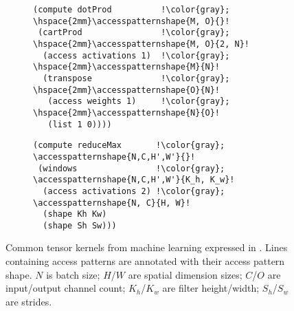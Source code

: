 \begin{figure*}
\begin{minipage}{.45\textwidth}
\begin{subfigure}{\textwidth}
\begin{lstlisting}[basicstyle=\footnotesize,escapechar=!]
(compute dotProd          !\color{gray}; \hspace{2mm}\accesspatternshape{M, O}{}!
 (cartProd                !\color{gray}; \hspace{2mm}\accesspatternshape{M, O}{2, N}!
  (access activations 1)  !\color{gray}; \hspace{2mm}\accesspatternshape{M}{N}!
  (transpose              !\color{gray}; \hspace{2mm}\accesspatternshape{O}{N}!
   (access weights 1)     !\color{gray}; \hspace{2mm}\accesspatternshape{N}{O}!
   (list 1 0))))
  \end{lstlisting}
  \vspace{-1.5em} 
  \label{fig:mat-mat-mult}
\end{subfigure}

\begin{subfigure}{\textwidth}
\begin{lstlisting}[basicstyle=\footnotesize,escapechar=!]
(compute reduceMax       !\color{gray}; \accesspatternshape{N,C,H',W'}{}!
 (windows                !\color{gray}; \accesspatternshape{N,C,H',W'}{K_h, K_w}!
  (access activations 2) !\color{gray}; \accesspatternshape{N, C}{H, W}!
  (shape Kh Kw)
  (shape Sh Sw)))
\end{lstlisting}
  \vspace{-1em} 
  \label{fig:maxpool-code}
\end{subfigure}

\end{minipage}
\caption{Common tensor kernels from machine learning expressed in \g. Lines containing access patterns are annotated with their access pattern shape.
$N$ is batch size; $H$/$W$ are spatial dimension sizes; $C$/$O$ are input/output channel count; $K_h$/$K_w$ are filter height/width; $S_h$/$S_w$ are strides.
}
\label{fig:all-kernels}
\end{figure*}

